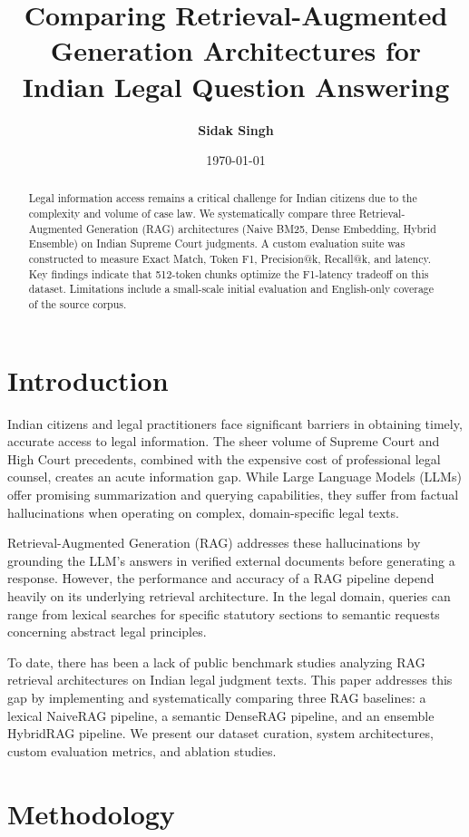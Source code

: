 \documentclass[11pt]{article}
\title{\textbf{Comparing Retrieval-Augmented Generation Architectures for Indian Legal Question Answering}}
\author{\textbf{Sidak Singh}}
\date{\today}
\begin{document}
\maketitle

\begin{abstract}
Legal information access remains a critical challenge for Indian citizens due to the complexity and volume of case law. We systematically compare three Retrieval-Augmented Generation (RAG) architectures (Naive BM25, Dense Embedding, Hybrid Ensemble) on Indian Supreme Court judgments. A custom evaluation suite was constructed to measure Exact Match, Token F1, Precision@k, Recall@k, and latency. Key findings indicate that 512-token chunks optimize the F1-latency tradeoff on this dataset. Limitations include a small-scale initial evaluation and English-only coverage of the source corpus.
\end{abstract}

\section{Introduction}
Indian citizens and legal practitioners face significant barriers in obtaining timely, accurate access to legal information. The sheer volume of Supreme Court and High Court precedents, combined with the expensive cost of professional legal counsel, creates an acute information gap. While Large Language Models (LLMs) offer promising summarization and querying capabilities, they suffer from factual hallucinations when operating on complex, domain-specific legal texts.

Retrieval-Augmented Generation (RAG) addresses these hallucinations by grounding the LLM's answers in verified external documents before generating a response. However, the performance and accuracy of a RAG pipeline depend heavily on its underlying retrieval architecture. In the legal domain, queries can range from lexical searches for specific statutory sections to semantic requests concerning abstract legal principles.

To date, there has been a lack of public benchmark studies analyzing RAG retrieval architectures on Indian legal judgment texts. This paper addresses this gap by implementing and systematically comparing three RAG baselines: a lexical NaiveRAG pipeline, a semantic DenseRAG pipeline, and an ensemble HybridRAG pipeline. We present our dataset curation, system architectures, custom evaluation metrics, and ablation studies.

\section{Methodology}
\end{document}
